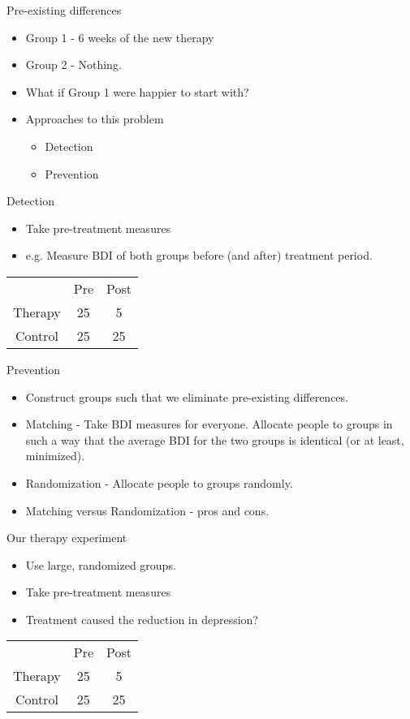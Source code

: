 \documentclass{beamer}
\begin{document}
\begin{frame}{Pre-existing differences}
\begin{itemize}
\item Group 1 - 6 weeks of the new therapy
\item Group 2 - Nothing.
\vspace{12 pt}
\item What if Group 1 were happier to start with?
\vspace{12 pt}
\item Approaches to this problem
\begin{itemize}
\item Detection
\item Prevention
\end{itemize}
\end{itemize}
\end{frame}

\begin{frame}{Detection}
\begin{itemize}
\item Take pre-treatment measures
\item e.g. Measure BDI of both groups before (and after) treatment period.
\end{itemize}
\begin{tabular} {c c c}
			&	Pre	 &	Post \\
Therapy	&	25	&		5 \\
Control	&	25	&		25 \\
\end{tabular} 
\end{frame}

\begin{frame}{Prevention}
\begin{itemize}
\item Construct groups such that we eliminate pre-existing differences.
\item Matching - Take BDI measures for everyone. Allocate people to groups in such a way that the average BDI for the two groups is identical (or at least, minimized).
\item Randomization - Allocate people to groups randomly.
\item Matching versus Randomization - pros and cons.
\end{itemize}
\end{frame}

\begin{frame}{Our therapy experiment}
\begin{itemize}
\item Use large, randomized groups.
\item Take pre-treatment measures
\item Treatment caused the reduction in depression?
\end{itemize}
\vspace{12 pt}
\begin{tabular} {c c c}
			&	Pre	 &	Post \\
Therapy	&	25	&		5 \\
Control	&	25	&		25 \\
\end{tabular} 
\end{frame}
\end{document}
